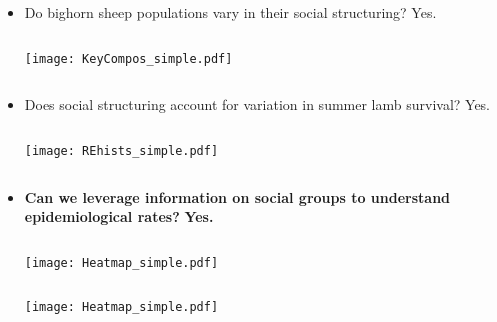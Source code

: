 \documentclass[fleqn,xcolor=table]{beamer}
\begin{document}
{
\begin{frame}[t]
	\begin{itemize}
		\item[] \color{navy} \footnotesize Do bighorn sheep populations vary in their social
			structuring?
			\color{darkred} Yes.
	\begin{columns}
			\texttt{[image: KeyCompos\_simple.pdf]}
			\vspace{.1in}
	\end{columns}
		\item[] \color{navy} \footnotesize Does social structuring account for variation in
			summer lamb survival?
			\color{darkred} Yes.
	\begin{columns}
		\column{.3\textwidth}
			\texttt{[image: REhists\_simple.pdf]}
			\vspace{.1in}
		\column{.7\textwidth}
	\end{columns}

			\vspace{.1in}
		\item[] \color{navy} \footnotesize \textbf{Can we leverage
				information on social groups to understand 
			epidemiological rates?}
			\color{darkred} \textbf{Yes.}

	\begin{columns}
			\texttt{[image: Heatmap\_simple.pdf]}
			\vspace{.1in}
	\end{columns}
			\texttt{[image: Heatmap\_simple.pdf]}
	\end{itemize}
\end{frame}
}
\end{document}
